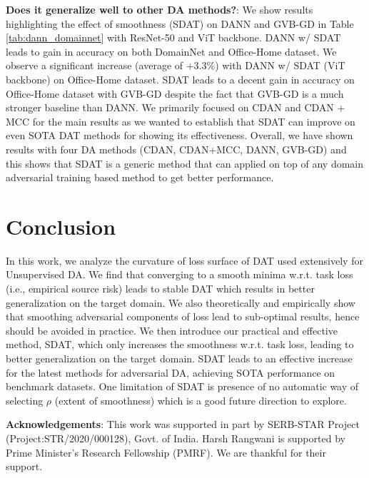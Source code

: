 \documentclass[table,dvipsnames]{article}
\theoremstyle{plain}
\theoremstyle{definition}
\theoremstyle{remark}
\begin{document}
\textbf{Does it generalize well to other DA methods?}: We show results highlighting the effect of smoothness (SDAT) on DANN\cite{ganin2016domain} and GVB-GD \cite{cui2020gvb} in Table \ref{tab:dann_domainnet} with ResNet-50 and ViT backbone. DANN w/ SDAT leads to gain in accuracy on both DomainNet and Office-Home dataset. We observe a significant increase (average of +3.3\%) with DANN w/ SDAT (ViT backbone) on Office-Home dataset. SDAT leads to a decent gain in accuracy on Office-Home dataset with GVB-GD despite the fact that GVB-GD is a much stronger baseline than DANN. We primarily focused on CDAN and CDAN + MCC for the main results as we wanted to establish that SDAT can improve on even SOTA DAT methods for showing its effectiveness. Overall, we have shown results with four DA methods (CDAN, CDAN+MCC, DANN, GVB-GD) and this shows that SDAT is a generic method that can applied on top of any domain adversarial training based method to get better performance.








\section{Conclusion}
In this work, we analyze the curvature of loss surface of DAT used extensively for Unsupervised DA. We find that converging to a smooth minima w.r.t. {task} loss (i.e., empirical source risk) leads to stable DAT which results in better generalization on the target domain. We also theoretically and empirically show that smoothing adversarial components of loss lead to sub-optimal results, hence should be avoided in practice. We then introduce our practical and effective method, SDAT, which only increases the smoothness w.r.t. {task} loss, leading to better generalization on the target domain. SDAT leads to an effective increase for the latest methods for adversarial DA, achieving SOTA performance on benchmark datasets. One limitation of SDAT is presence of no automatic way of selecting $\rho$ (extent of smoothness) which is a good future direction to explore. 

\textbf{Acknowledgements}: This work was supported in part by  SERB-STAR Project (Project:STR/2020/000128), Govt. of India. Harsh Rangwani is supported by Prime Minister's Research Fellowship (PMRF). We are thankful for their support.





\end{document}
